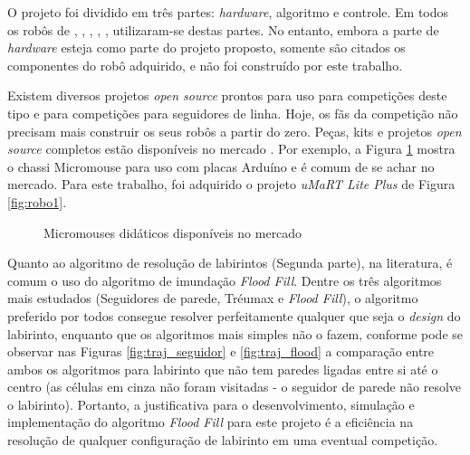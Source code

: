 O projeto foi dividido em três partes: \textit{hardware}, algoritmo e controle. Em todos os robôs de , , , , ,  utilizaram-se destas partes. No entanto, embora a parte de \emph{hardware} esteja como parte do projeto proposto, somente são citados os componentes do robô adquirido, e não foi construído por este trabalho.

Existem diversos projetos \emph{open source} prontos para uso para competições deste tipo e para competições para seguidores de linha. Hoje, os fãs da competição não precisam mais construir os seus robôs a partir do zero. Peças, kits e projetos \emph{open source} completos estão disponíveis no mercado \cite{Christian:2014}. Por exemplo, a Figura \ref{fig:opensource_micro} mostra o chassi Micromouse para uso com placas Arduíno e é comum de se achar no mercado. Para este trabalho, foi adquirido o projeto \emph{uMaRT Lite Plus} de Figura \ref{fig:robo1}. 


\begin{figure}[!htb]
	\caption[Micromouses open source prontos para uso]{\label{fig:opensource_micro}Micromouses didáticos disponíveis no mercado}
	\begin{center}
		\hspace*{0.1\linewidth}
	\end{center}
\end{figure}

Quanto ao algoritmo de resolução de labirintos (Segunda parte), na literatura, é comum o uso do algoritmo de imundação \emph{Flood Fill}. Dentre os três algoritmos mais estudados (Seguidores de parede, Tréumax e \emph{Flood Fill}), o algoritmo preferido por todos consegue resolver perfeitamente qualquer que seja o \emph{design} do labirinto, enquanto que os algoritmos mais simples não o fazem, conforme pode se observar nas Figuras \ref{fig:traj_seguidor} e \ref{fig:traj_flood} a comparação entre ambos os algoritmos para labirinto que não tem paredes ligadas entre si até o centro (as células em cinza não foram visitadas - o seguidor de parede não resolve o labirinto). Portanto, a justificativa para o desenvolvimento, simulação e implementação do algoritmo \emph{Flood Fill} para este projeto é a eficiência na resolução de qualquer configuração de labirinto em uma eventual competição.


